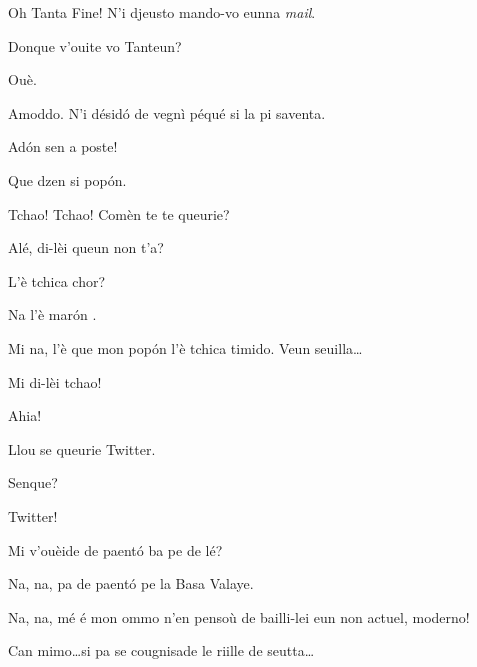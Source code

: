 \begin{drama}
\Tanteunspeaks{} Oh Tanta Fine! N'i djeusto mando-vo eunna \textit{mail}.

\Tantaspeaks Donque v'ouite vo Tanteun?

\Tanteunspeaks Ouè.

\Tantaspeaks Amoddo. N'i désid\'o de vegnì péqué si la pi saventa.

\Tanteunspeaks Ad\'on sen a poste!


\Tantaspeaks{} Que dzen si pop\'on.


\Tantaspeaks Tchao!  Tchao! Comèn te te queurie?


\Alicespeaks{} Alé, di-lèi queun non t'a?


\Tantaspeaks L'è tchica chor?

\Tanteunspeaks Na l'è mar\'on .

\Alicespeaks Mi na, l'è que mon pop\'on l'è tchica timido.  Veun seuilla\ldots


\Tanteunspeaks{} Mi di-lèi tchao!


\Twitterspeaks Ahia!

\Alicespeaks{} Llou se queurie Twitter.

\Tantaspeaks{} Senque? 

\Alicespeaks Twitter!

\Tantaspeaks Mi v'ouèide de paent\'o ba pe de lé?

\Tanteunspeaks Na, na, pa de paent\'o pe la Basa Valaye.

\Alicespeaks Na, na, mé é mon ommo n’en pensoù de bailli-lei eun non actuel, moderno!

\Tantaspeaks Can mimo\ldots si pa se cougnisade le riille de seutta\ldots



\end{drama}
